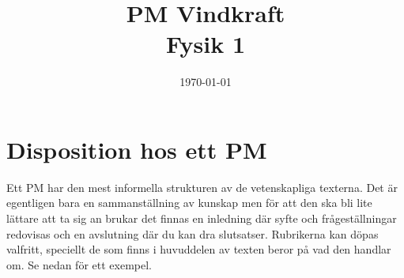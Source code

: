 \documentclass[11p]{article}
\title{PM Vindkraft \\ \small Fysik 1}
\author{\name}
\date{\today}
\makeatletter
\def\name{Fabian Sigfridsson}
\def\email{fabian.sigfridsson@elev.ga.ntig.se}
\def\foottitle{PM Vindkraft}
\makeatother
\begin{document}
    \tableofcontents
    \newpage
    \section{Disposition hos ett PM}
    Ett PM har den mest informella strukturen av de vetenskapliga texterna.
    Det är egentligen bara en sammanställning av kunskap men för att den ska
    bli lite lättare att ta sig an brukar det finnas en inledning där syfte
    och frågeställningar redovisas och en avslutning där du kan dra slutsatser.
    Rubrikerna kan döpas valfritt, speciellt de som finns i huvuddelen av texten
    beror på vad den handlar om. Se nedan för ett exempel.
\end{document}
